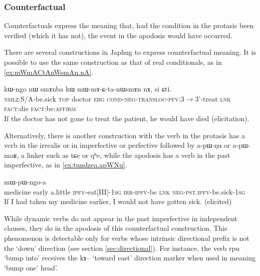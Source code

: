 \documentclass[oldfontcommands,oneside,a4paper,11pt]{article}
\newcommand{\ipa}[1]{{\phon \mbox{#1}}} %
\begin{document}
\subsubsection{Counterfactual} \label{sec:counterfact}
Counterfactuals express the meaning that, had the condition in the protasis been verified (which it has not), the event in the apodosis would have occurred.

There are several constructions in Japhug to express counterfactual meaning. It is possible to use the same construction as that of real conditionals, as    in \ref{ex:mWmACtAnWsmAn.nA}.
     \begin{exe}
   \ex \label{ex:mWmACtAnWsmAn.nA}
   \gll
\ipa{kɯ-ngo}  	\ipa{nɯ}  	\ipa{smɤnba}  	\ipa{kɯ}  	\ipa{mɯ-mɤ-ɕ-ta-nɯsmɤn}  	\ipa{nɤ,}  	\ipa{si}  	\ipa{ɕti.}  \\
\textsc{nmlz}:S/A-be.sick \textsc{top} doctor \textsc{erg} \textsc{cond-neg-transloc-pfv}:3$\rightarrow$3'-treat \textsc{lnk} \textsc{fact}:die \textsc{fact}:be:\textsc{affirm} \\
\glt If the doctor has not gone to treat the patient, he would have died (elicitation).
\end{exe}

Alternatively, there is another construction with the verb in the protasis has a verb  in the  irrealis or in imperfective or perfective followed by \ipa{a-pɯ-ŋu} or \ipa{a-pɯ-maʁ}, a linker such as \ipa{tɕe} or \ipa{qʰe}, while the apodosis has a verb in the past imperfective, as in \ref{ex:tundzea.apWNu}.

     \begin{exe}
   \ex \label{ex:tundzea.apWNu}
   \gll
[\ipa{smɤn}   	\ipa{ʑa} \ipa{tsa}   	\ipa{tu-ndze-a}   	\textbf{\ipa{a-pɯ-ŋu}}]   	\ipa{tɕe}   	\ipa{mɯ-pɯ-ngo-a}   \\
medicine early  a.little \textsc{ipfv}-eat[III]-\textsc{1sg} \textsc{irr-ipfv}-be \textsc{lnk} \textsc{neg-pst.ipfv}-be.sick-\textsc{1sg} \\
\glt If I had taken my medicine earlier, I would not have gotten sick. (elicited)
\end{exe}

While dynamic verbs do not appear in the past imperfective in independent clauses, they do in the apodosis of this counterfactual construction. This phenomenon is   detectable only for   verbs whose intrinsic directional prefix is not the `down' direction (see section \ref{sec:directional}). For instance, the verb \ipa{rpu} `bump into' receives the \ipa{kɤ}-- `toward east' direction marker when used in meaning `bump one' head'.
\end{document}
